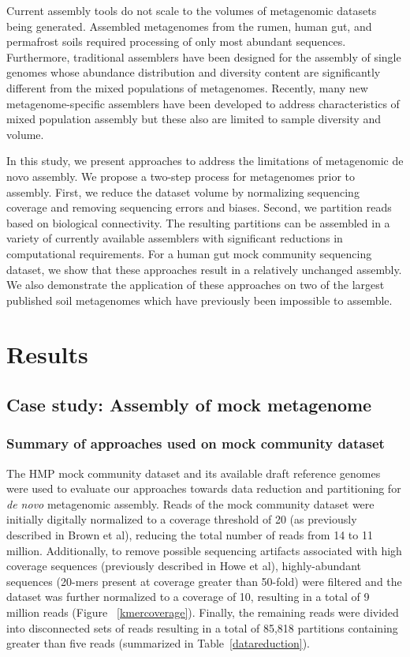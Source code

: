 \documentclass[11pt]{article} %
\begin{document}
Current assembly tools do not scale to the volumes of metagenomic datasets being generated. Assembled metagenomes from the rumen, human gut, and permafrost soils required processing of only most abundant sequences.  Furthermore, traditional assemblers have been designed for the assembly of single genomes whose abundance distribution and diversity content are significantly different from the mixed populations of metagenomes.  Recently, many new metagenome-specific assemblers have been developed to address characteristics of mixed population assembly but these also are limited to sample diversity and volume.    

In this study, we present approaches to address the limitations of metagenomic de novo assembly.  We propose a two-step process for metagenomes prior to assembly.  First, we reduce the dataset volume by normalizing sequencing coverage and removing sequencing errors and biases.  Second, we partition reads based on biological connectivity.  The resulting partitions can be assembled in a variety of currently available assemblers with significant reductions in computational requirements.  For a human gut mock community sequencing dataset, we show that these approaches result in a relatively unchanged assembly.  We also demonstrate the application of these approaches on two of the largest published soil metagenomes which have previously been impossible to assemble. 

\section{Results}

\subsection{Case study:  Assembly of mock metagenome}

\subsubsection{Summary of approaches used on mock community dataset}

The HMP mock community dataset and its available draft reference genomes were used to evaluate our approaches towards data reduction and partitioning for \emph{de novo} metagenomic assembly.   Reads of the mock community dataset were initially digitally normalized to a coverage threshold of 20 (as previously described in Brown et al), reducing the total number of reads from 14 to 11 million.  Additionally, to remove possible sequencing artifacts associated with high coverage sequences (previously described in Howe et al), highly-abundant sequences (20-mers present at coverage greater than 50-fold) were filtered and the dataset was further normalized to a coverage of 10, resulting in a total of 9 million reads (Figure ~\ref{kmercoverage}).  Finally, the remaining reads were divided into disconnected sets of reads resulting in a total of 85,818 partitions containing greater than five reads (summarized in Table~\ref{datareduction}).
\end{document}
